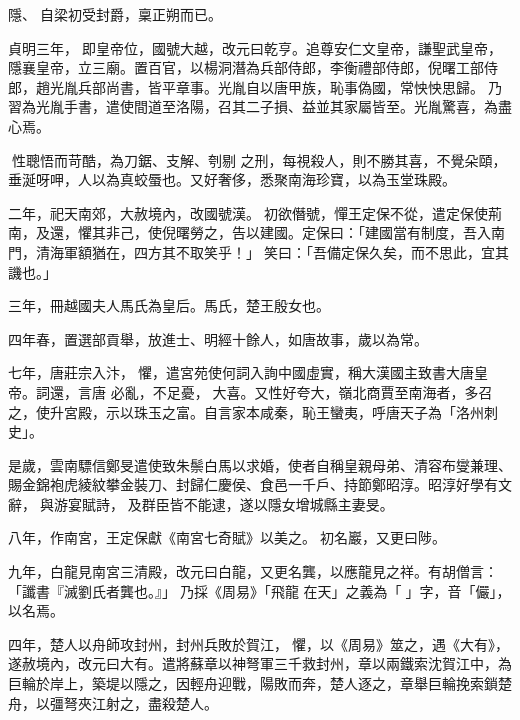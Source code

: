 \begin{pinyinscope}
 隱、自梁初受封爵，稟正朔而已。



 貞明三年，即皇帝位，國號大越，改元曰乾亨。追尊安仁文皇帝，謙聖武皇帝，隱襄皇帝，立三廟。置百官，以楊洞潛為兵部侍郎，李衡禮部侍郎，倪曙工部侍郎，趙光胤兵部尚書，皆平章事。光胤自以唐甲族，恥事偽國，常怏怏思歸。乃習為光胤手書，遣使間道至洛陽，召其二子損、益並其家屬皆至。光胤驚喜，為盡心焉。



 性聰悟而苛酷，為刀鋸、支解、刳剔
 之刑，每視殺人，則不勝其喜，不覺朵頤，垂涎呀呷，人以為真蛟蜃也。又好奢侈，悉聚南海珍寶，以為玉堂珠殿。



 二年，祀天南郊，大赦境內，改國號漢。初欲僭號，憚王定保不從，遣定保使荊南，及還，懼其非己，使倪曙勞之，告以建國。定保曰：「建國當有制度，吾入南門，清海軍額猶在，四方其不取笑乎！」笑曰：「吾備定保久矣，而不思此，宜其譏也。」



 三年，冊越國夫人馬氏為皇后。馬氏，楚王殷女也。



 四年春，置選部貢舉，放進士、明經十餘人，如唐故事，歲以為常。



 七年，唐莊宗入汴，懼，遣宮苑使何詞入詢中國虛實，稱大漢國主致書大唐皇帝。詞還，言唐
 必亂，不足憂，大喜。又性好夸大，嶺北商賈至南海者，多召之，使升宮殿，示以珠玉之富。自言家本咸秦，恥王蠻夷，呼唐天子為「洛州刺史」。



 是歲，雲南驃信鄭旻遣使致朱鬃白馬以求婚，使者自稱皇親母弟、清容布燮兼理、賜金錦袍虎綾紋攀金裝刀、封歸仁慶侯、食邑一千戶、持節鄭昭淳。昭淳好學有文辭，與游宴賦詩，及群臣皆不能逮，遂以隱女增城縣主妻旻。



 八年，作南宮，王定保獻《南宮七奇賦》以美之。初名巖，又更曰陟。



 九年，白龍見南宮三清殿，改元曰白龍，又更名龔，以應龍見之祥。有胡僧言：「讖書『滅劉氏者龔也。』」乃採《周易》「飛龍
 在天」之義為「」字，音「儼」，以名焉。



 四年，楚人以舟師攻封州，封州兵敗於賀江，懼，以《周易》筮之，遇《大有》，遂赦境內，改元曰大有。遣將蘇章以神弩軍三千救封州，章以兩鐵索沈賀江中，為巨輪於岸上，築堤以隱之，因輕舟迎戰，陽敗而奔，楚人逐之，章舉巨輪挽索鎖楚舟，以彊弩夾江射之，盡殺楚人。




\end{pinyinscope}
